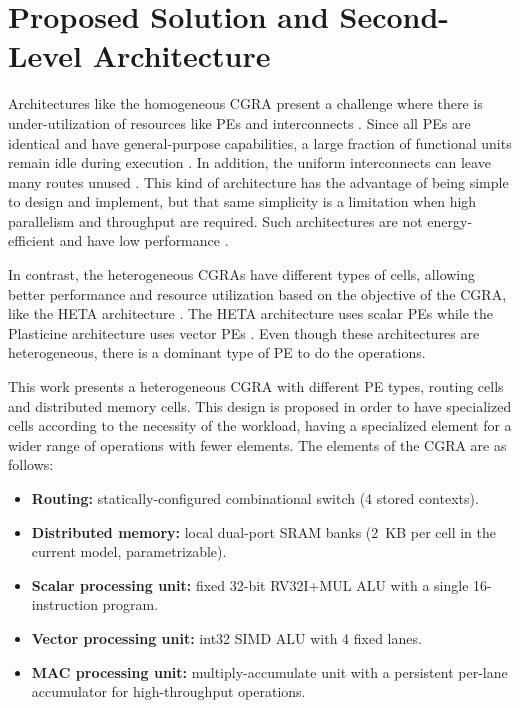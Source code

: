 \documentclass[conference]{IEEEtran}
\begin{document}

\section{Proposed Solution and Second-Level Architecture}


Architectures like the homogeneous CGRA present a challenge where there is under-utilization of resources like PEs and interconnects \cite{adres2004, hycube2017}. 
Since all PEs are identical and have general-purpose capabilities, a large fraction of functional units remain idle during execution \cite{HETA}. 
In addition, the uniform interconnects can leave many routes unused \cite{dvhetero}.
This kind of architecture has the advantage of being simple to design and implement, but that same simplicity is a limitation when high parallelism and throughput are required. 
Such architectures are not energy-efficient and have low performance \cite{Blocks2022}.

In contrast, the heterogeneous CGRAs have different types of cells, allowing better performance and resource utilization based on the objective of the CGRA, like the HETA architecture \cite{HETA}.
The HETA architecture uses scalar PEs \cite{HETA} while the Plasticine architecture uses vector PEs \cite{plasticine2017}. Even though these architectures are heterogeneous, there is a dominant type of PE to do the operations.


This work presents a heterogeneous CGRA with different PE types, routing cells and distributed memory cells. This design is proposed in order to have specialized cells according to the necessity of the workload, having a specialized element for a wider range of operations with fewer elements. The elements of the CGRA are as follows:

\begin{itemize}
    \item \textbf{Routing:} statically-configured combinational switch (4 stored contexts).
    \item \textbf{Distributed memory:} local dual-port SRAM banks (2~KB per cell in the current model, parametrizable).
    \item \textbf{Scalar processing unit:} fixed 32-bit RV32I+MUL ALU with a single 16-instruction program.
    \item \textbf{Vector processing unit:} int32 SIMD ALU with 4 fixed lanes.
    \item \textbf{MAC processing unit:} multiply-accumulate unit with a persistent per-lane accumulator for high-throughput operations.
\end{itemize}
\end{document}
